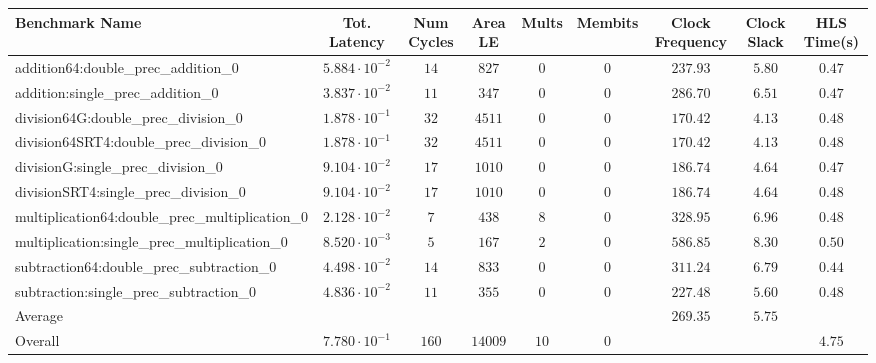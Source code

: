 \begin{tabular}{|l|c|c|c|c|c|c|c|c|}
\hline
Benchmark Name                                   & Tot. Latency            & Num Cycles & Area LE   & Mults  & Membits & Clock Frequency & Clock Slack & HLS Time(s) \\
\hline
addition64:double\_prec\_addition\_0             & $ 5.884 \cdot 10^{-2} $ & $ 14     $ & $ 827   $ & $ 0  $ & $ 0   $ & $ 237.93      $ & $ 5.80    $ & $ 0.47    $ \\
addition:single\_prec\_addition\_0               & $ 3.837 \cdot 10^{-2} $ & $ 11     $ & $ 347   $ & $ 0  $ & $ 0   $ & $ 286.70      $ & $ 6.51    $ & $ 0.47    $ \\
division64G:double\_prec\_division\_0            & $ 1.878 \cdot 10^{-1} $ & $ 32     $ & $ 4511  $ & $ 0  $ & $ 0   $ & $ 170.42      $ & $ 4.13    $ & $ 0.48    $ \\
division64SRT4:double\_prec\_division\_0         & $ 1.878 \cdot 10^{-1} $ & $ 32     $ & $ 4511  $ & $ 0  $ & $ 0   $ & $ 170.42      $ & $ 4.13    $ & $ 0.48    $ \\
divisionG:single\_prec\_division\_0              & $ 9.104 \cdot 10^{-2} $ & $ 17     $ & $ 1010  $ & $ 0  $ & $ 0   $ & $ 186.74      $ & $ 4.64    $ & $ 0.47    $ \\
divisionSRT4:single\_prec\_division\_0           & $ 9.104 \cdot 10^{-2} $ & $ 17     $ & $ 1010  $ & $ 0  $ & $ 0   $ & $ 186.74      $ & $ 4.64    $ & $ 0.48    $ \\
multiplication64:double\_prec\_multiplication\_0 & $ 2.128 \cdot 10^{-2} $ & $ 7      $ & $ 438   $ & $ 8  $ & $ 0   $ & $ 328.95      $ & $ 6.96    $ & $ 0.48    $ \\
multiplication:single\_prec\_multiplication\_0   & $ 8.520 \cdot 10^{-3} $ & $ 5      $ & $ 167   $ & $ 2  $ & $ 0   $ & $ 586.85      $ & $ 8.30    $ & $ 0.50    $ \\
subtraction64:double\_prec\_subtraction\_0       & $ 4.498 \cdot 10^{-2} $ & $ 14     $ & $ 833   $ & $ 0  $ & $ 0   $ & $ 311.24      $ & $ 6.79    $ & $ 0.44    $ \\
subtraction:single\_prec\_subtraction\_0         & $ 4.836 \cdot 10^{-2} $ & $ 11     $ & $ 355   $ & $ 0  $ & $ 0   $ & $ 227.48      $ & $ 5.60    $ & $ 0.48    $ \\
\hline
Average                                          & $                     $ & $        $ & $       $ & $    $ & $     $ & $ 269.35      $ & $ 5.75    $ & $         $ \\
\hline
Overall                                          & $ 7.780 \cdot 10^{-1} $ & $ 160    $ & $ 14009 $ & $ 10 $ & $ 0   $ & $             $ & $         $ & $ 4.75    $ \\
\hline
\end{tabular}
